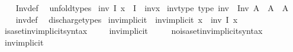 \begin{isabellebody}
%
\isadelimproof
\ \ %
\endisadelimproof
%
\isatagproof
{}\isamarkupfalse%
\ Inv{\isacharunderscore}{\kern0pt}def\ \isamarkupfalse%
\ unfold{\isacharunderscore}{\kern0pt}types%
\endisatagproof
{\isafoldproof}%
%
\isadelimproof
\isanewline
%
\endisadelimproof
\isanewline
{}\isamarkupfalse%
\ {\isachardoublequoteopen}inv\ I\ x\ {\isacharequal}{\kern0pt}\ {\isacharparenleft}{\kern0pt}I\ {\isacharat}{\kern0pt}{\isacharat}{\kern0pt}\ inv{\isacharparenright}{\kern0pt}{\isacharbackquote}{\kern0pt}x{\isachardoublequoteclose}\isanewline
\isanewline
{}\isamarkupfalse%
\ inv{\isacharunderscore}{\kern0pt}type\ {\isacharbrackleft}{\kern0pt}type{\isacharbrackright}{\kern0pt}{\isacharcolon}{\kern0pt}\ {\isachardoublequoteopen}inv\ {\isacharcolon}{\kern0pt}\ Inv\ A\ {\isasymRightarrow}\ A\ {\isasymRightarrow}\ A{\isachardoublequoteclose}\isanewline
%
\isadelimproof
\ \ %
\endisadelimproof
%
\isatagproof
{}\isamarkupfalse%
\ inv{\isacharunderscore}{\kern0pt}def\ \isamarkupfalse%
\ discharge{\isacharunderscore}{\kern0pt}types%
\endisatagproof
{\isafoldproof}%
%
\isadelimproof
\isanewline
%
\endisadelimproof
\isanewline
{}\isamarkupfalse%
\ inv{\isacharunderscore}{\kern0pt}implicit\ \ {\isachardoublequoteopen}inv{\isacharunderscore}{\kern0pt}implicit\ x\ {\isasymequiv}\ inv\ {\isasymimplicit}I\ x{\isachardoublequoteclose}\isanewline
\isanewline
{}\isamarkupfalse%
\ isa{\isacharunderscore}{\kern0pt}set{\isacharunderscore}{\kern0pt}inv{\isacharunderscore}{\kern0pt}implicit{\isacharunderscore}{\kern0pt}syntax\isanewline
\ \ \ \isamarkupfalse%
\ inv{\isacharunderscore}{\kern0pt}implicit\ \ {\isacharparenleft}{\kern0pt}{\isachardoublequoteopen}{\isacharunderscore}{\kern0pt}{\isasyminverse}{\isachardoublequoteclose}\ {\isacharbrackleft}{\kern0pt}{}{}{}{}{\isacharbrackright}{\kern0pt}{\isacharparenright}{\kern0pt}\ \isamarkupfalse%
\isanewline
\isanewline
{}\isamarkupfalse%
\ no{\isacharunderscore}{\kern0pt}isa{\isacharunderscore}{\kern0pt}set{\isacharunderscore}{\kern0pt}inv{\isacharunderscore}{\kern0pt}implicit{\isacharunderscore}{\kern0pt}syntax\isanewline
\ \ \ \isamarkupfalse%
\ inv{\isacharunderscore}{\kern0pt}implicit\ \ {\isacharparenleft}{\kern0pt}{\isachardoublequoteopen}{\isacharunderscore}{\kern0pt}{\isasyminverse}{\isachardoublequoteclose}\ {\isacharbrackleft}{\kern0pt}{}{}{}{}{\isacharbrackright}{\kern0pt}{\isacharparenright}{\kern0pt}\ \isamarkupfalse%
\isanewline
\isanewline
%
\isadelimtheory
\isanewline
%
\endisadelimtheory
%
\isatagtheory
{}\isamarkupfalse%
%
\endisatagtheory
{\isafoldtheory}%
%
\isadelimtheory
%
\endisadelimtheory
%
\end{isabellebody}%
